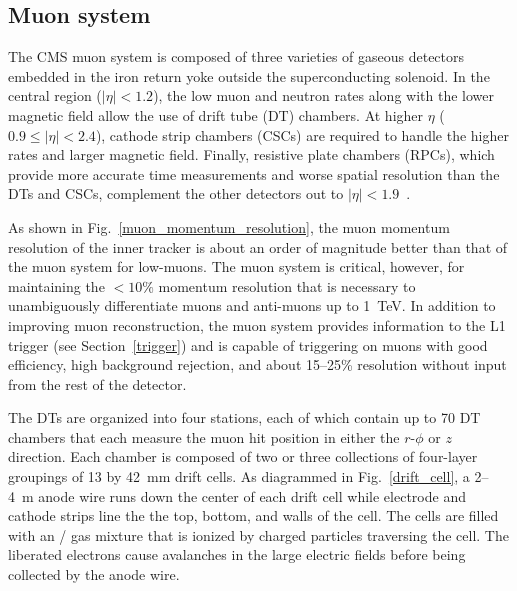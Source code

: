 

\subsection{Muon system}
The CMS muon system is composed of three varieties of gaseous detectors embedded in the iron return yoke outside the superconducting solenoid. In the central region ($|\eta|<1.2$), the low muon and neutron rates along with the lower magnetic field allow the use of drift tube (DT) chambers. At higher $\eta$ ($0.9\leq|\eta|<2.4$), cathode strip chambers (CSCs) are required to handle the higher rates and larger magnetic field. Finally, resistive plate chambers (RPCs), which provide more accurate time measurements and worse spatial resolution than the DTs and CSCs, complement the other detectors out to $|\eta|<1.9$~\cite{cms_tdr_v1, cms_ms_performance}.

As shown in Fig.~\ref{muon_momentum_resolution}, the muon momentum resolution of the inner tracker is about an order of magnitude better than that of the muon system for low-\pt muons. The muon system is critical, however, for maintaining the $<10\%$ momentum resolution that is necessary to unambiguously differentiate muons and anti-muons up to \SI{1}{\TeV}. In addition to improving muon reconstruction, the muon system provides information to the L1 trigger (see Section~\ref{trigger}) and is capable of triggering on muons with good efficiency, high background rejection, and about 15--25\% \pt resolution without input from the rest of the detector.



The DTs are organized into four stations, each of which contain up to 70 DT chambers that each measure the muon hit position in either the $r$-$\phi$ or $z$ direction. Each chamber is composed of two or three collections of four-layer groupings of \num{13} by \SI{42}{\mm} drift cells. As diagrammed in Fig.~\ref{drift_cell}, a \si{2}--\SI{4}{\m} anode wire runs down the center of each drift cell while electrode and cathode strips line the the top, bottom, and walls of the cell. The cells are filled with an / gas mixture that is ionized by charged particles traversing the cell. The liberated electrons cause avalanches in the large electric fields before being collected by the anode wire.



